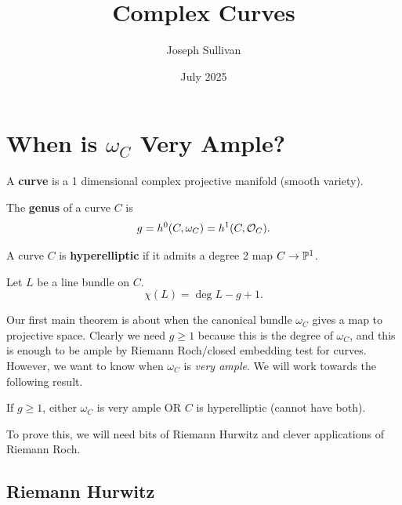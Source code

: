 \documentclass[12pt]{article}
\title{Complex Curves}
\author{Joseph Sullivan}
\date{July 2025}
\begin{document}
\maketitle
\tableofcontents


\section{When is $\omega_C$ Very Ample?}

\begin{defn}
    A \textbf{curve} is a 1 dimensional complex projective manifold (smooth variety).
\end{defn}

\begin{defn}
    The \textbf{genus} of a curve $C$ is
    \[g = h^0(C,\omega_C) = h^1(C, \cO_C).\]
\end{defn}

\begin{defn}
    A curve $C$ is \textbf{hyperelliptic} if it admits a degree 2 map $C\to \P^1$.
\end{defn}

\begin{thm}
    Let $L$ be a line bundle on $C$.
    \[\chi(L) = \deg L - g + 1.\]
\end{thm}

Our first main theorem is about when the canonical bundle $\omega_C$ gives a map to projective space. Clearly we need $g\geq 1$ because this is the degree of $\omega_C$, and this is enough to be ample by Riemann Roch/closed embedding test for curves. However, we want to know when $\omega_C$ is \textit{very ample}. We will work towards the following result.

\begin{thm}
    If $g\geq 1$, either $\omega_C$ is very ample OR $C$ is hyperelliptic (cannot have both).
\end{thm}

To prove this, we will need bits of Riemann Hurwitz and clever applications of Riemann Roch.

\subsection{Riemann Hurwitz}
\end{document}
